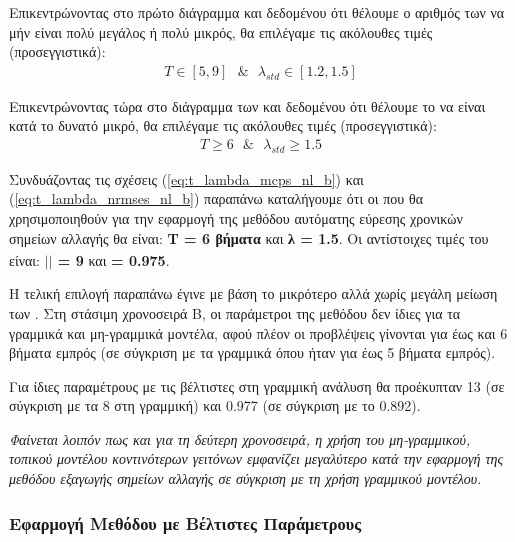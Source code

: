 \par Επικεντρώνοντας στο πρώτο διάγραμμα και δεδομένου ότι θέλουμε ο αριθμός των  να μήν είναι πολύ μεγάλος ή πολύ μικρός, θα επιλέγαμε τις ακόλουθες τιμές (προσεγγιστικά):
\begin{align}
    T \in [5,9] \ \ \ \& \ \ \ \lambda_{std} \in [1.2, 1.5]
    \label{eq:t_lambda_mcps_nl_b}
\end{align}

\par Επικεντρώνοντας τώρα στο διάγραμμα των  και δεδομένου ότι θέλουμε το  να είναι κατά το δυνατό μικρό, θα επιλέγαμε τις ακόλουθες τιμές (προσεγγιστικά):
\begin{align}
    T \geq 6 \ \ \ \& \ \ \ \lambda_{std} \geq 1.5
    \label{eq:t_lambda_nrmses_nl_b}
\end{align}

\par Συνδυάζοντας τις σχέσεις (\ref{eq:t_lambda_mcps_nl_b}) και (\ref{eq:t_lambda_nrmses_nl_b}) παραπάνω καταλήγουμε ότι οι  που θα χρησιμοποιηθούν για την εφαρμογή της μεθόδου αυτόματης εύρεσης χρονικών σημείων αλλαγής θα είναι:
\textbf{T = 6 βήματα} και \textbf{λ\textsubscript{} = 1.5}. Οι αντίστοιχες τιμές του  είναι: \textbf{$\vert$$\vert$ = 9 } και \textbf{ = 0.975}.

\par Η τελική επιλογή παραπάνω έγινε με βάση το μικρότερο  αλλά χωρίς μεγάλη μείωση των . Στη στάσιμη χρονοσειρά Β, οι παράμετροι της μεθόδου δεν ίδιες για τα γραμμικά και μη-γραμμικά μοντέλα, αφού πλέον οι προβλέψεις γίνονται για έως και 6 βήματα εμπρός (σε σύγκριση με τα γραμμικά όπου ήταν για έως 5 βήματα εμπρός). 

\par Για ίδιες παραμέτρους με τις βέλτιστες στη γραμμική ανάλυση θα προέκυπταν 13  (σε σύγκριση με τα 8 στη γραμμική) και  0.977 (σε σύγκριση με το 0.892).

\textit{Φαίνεται λοιπόν πως και για τη δεύτερη χρονοσειρά, η χρήση του μη-γραμμικού, τοπικού μοντέλου κοντινότερων γειτόνων εμφανίζει μεγαλύτερο  κατά την εφαρμογή της μεθόδου εξαγωγής σημείων αλλαγής σε σύγκριση με τη χρήση γραμμικού μοντέλου}.

\subsubsection{Εφαρμογή Μεθόδου με Βέλτιστες Παράμετρους}


